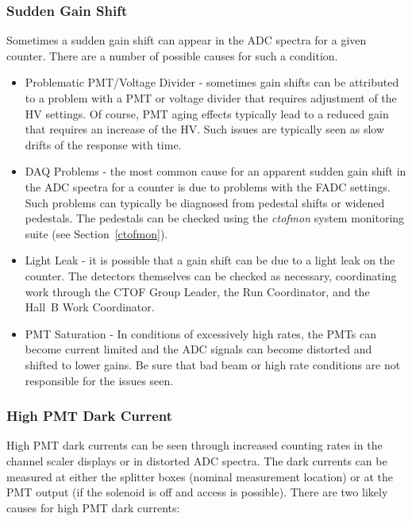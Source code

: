 \documentclass[12pt]{article}
\begin{document}
\subsubsection{Sudden Gain Shift}
\label{gain-shift}

Sometimes a sudden gain shift can appear in the ADC spectra for a given counter. There are a number of possible
causes for such a condition.

\begin{itemize}
\item Problematic PMT/Voltage Divider - sometimes gain shifts can be attributed to a problem with a PMT or
voltage divider that requires adjustment of the HV settings. Of course, PMT aging effects typically lead to a
reduced gain that requires an increase of the HV.  Such issues are typically seen as slow drifts of the response
with time.
\item DAQ Problems - the most common cause for an apparent sudden gain shift in the ADC spectra for a counter
is due to problems with the FADC settings. Such problems can typically be diagnosed from pedestal shifts or
widened pedestals. The pedestals can be checked using the {\it ctofmon} system monitoring suite (see
Section~\ref{ctofmon}).
\item Light Leak - it is possible that a gain shift can be due to a light leak on the counter. The detectors
themselves can be checked as necessary, coordinating work through the CTOF Group Leader, the Run
Coordinator, and the Hall~B Work Coordinator.
\item PMT Saturation - In conditions of excessively high rates, the PMTs can become current limited and the
ADC signals can become distorted and shifted to lower gains. Be sure that bad beam or high rate conditions
are not responsible for the issues seen.
\end{itemize}

\subsubsection{High PMT Dark Current}
\label{high-current}

High PMT dark currents can be seen through increased counting rates in the channel scaler displays or in
distorted ADC spectra. The dark currents can be measured at either the splitter boxes (nominal measurement
location) or at the PMT output (if the solenoid is off and access is possible). There are two likely causes for
high PMT dark currents:
\end{document}
